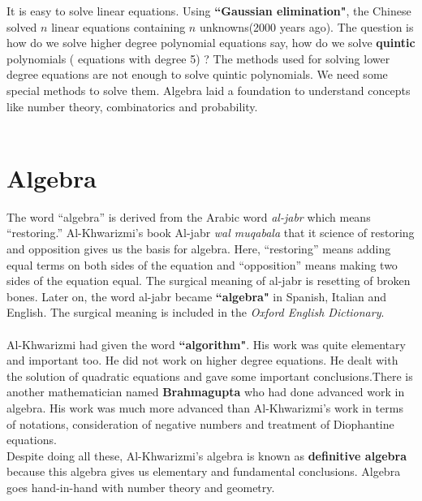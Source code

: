 \documentclass[a4paper,reqno,11pt]{book}
\theoremstyle{plain}%
\theoremstyle{definition}
\begin{document}
It is easy to solve linear equations. Using \textbf{``Gaussian elimination"}, the Chinese solved $n$ linear equations containing $n$ unknowns(2000 years ago). 
The question is how do we solve higher degree polynomial equations say, how do we solve \textbf{quintic} polynomials ( equations with degree 5) ? The methods used for solving lower degree equations are not enough to solve quintic polynomials. We need some special methods to solve them.
Algebra laid a foundation to understand concepts like number theory, combinatorics and probability.\\
\\
\section{Algebra}
The word ``algebra” is derived from the Arabic word \textit{al-jabr} which means ``restoring.” Al-Khwarizmi's book Al-jabr \textit{wal muqabala} that it science of restoring and opposition gives us the basis for algebra. Here, ``restoring” means adding equal terms on both sides of the equation and ``opposition” means making two sides of the equation equal. The surgical meaning of al-jabr is resetting of broken bones. Later on, the word al-jabr became \textbf{``algebra"} in Spanish, Italian and English. The surgical meaning is included in the \textit{Oxford English Dictionary}. \\
\\
\indent Al-Khwarizmi had given the word \textbf{``algorithm"}. His work was quite elementary and important too. He did not work on higher degree equations. He dealt with the solution of quadratic equations and gave some important conclusions.There is another mathematician named \textbf{Brahmagupta} who had done advanced work in algebra. His work was much more advanced than Al-Khwarizmi's work in terms of notations, consideration of negative numbers and treatment of Diophantine equations.\\
\indent Despite doing all these, Al-Khwarizmi's algebra is known as \textbf{definitive algebra} because this algebra gives us elementary and fundamental conclusions.
Algebra goes hand-in-hand with number theory and geometry. \\
\end{document}
